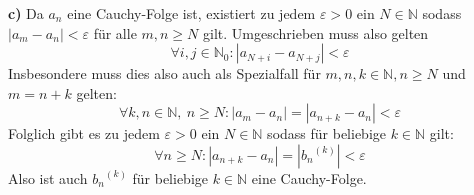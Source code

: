 \documentclass[a4paper,graphics,11pt]{article}
\begin{document}
\textbf{c)}
Da $a_n$ eine Cauchy-Folge ist, existiert zu jedem $\varepsilon > 0$ ein $N\in \mathbb{N}$
sodass $|a_m-a_n| < \varepsilon$ für alle $m,n \geq N$ gilt. Umgeschrieben muss also gelten
$$
    \forall i,j\in \mathbb{N}_0\colon |a_{N+i}-a_{N+j}| < \varepsilon
$$
Insbesondere muss dies also auch als Spezialfall für
$m,n,k \in \mathbb{N}, n \geq N$ und $m=n+k$ gelten:
$$
    \forall k,n \in \mathbb{N},\ n \geq N\colon |a_m-a_n| = |a_{n+k}-a_n| < \varepsilon
$$
Folglich gibt es zu jedem $\varepsilon > 0$ ein $N \in \mathbb{N}$ sodass für beliebige
$k \in \mathbb{N}$ gilt:
$$
    \forall n \geq N \colon |a_{n+k}-a_n| = |{b_n}^{(k)}|< \varepsilon
$$
Also ist auch ${b_n}^{(k)}$ für beliebige $k \in \mathbb{N}$ eine Cauchy-Folge.
\end{document}
